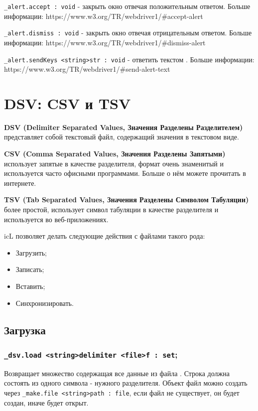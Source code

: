 \documentclass[a4paper, 14pt]{extarticle}
\newcommand{\ferror}[1]{{\fontsize{11pt}{12pt} \tt \colorbox{function}{\textcolor{white}{#1}}}}
\newenvironment{icItems}
	{ \begin{itemize} [noitemsep,nolistsep] }
	{ \end{itemize} }
\begin{document}
\lstinline|_alert.accept : void| - закрыть окно отвечая положительным ответом. Больше информации: https://www.w3.org/TR/webdriver1/\#accept-alert

\lstinline|_alert.dismiss : void| - закрыть окно отвечая отрицательным ответом. Больше информации: https://www.w3.org/TR/webdriver1/\#dismiss-alert

\lstinline|_alert.sendKeys <string>str : void| - ответить текстом . Больше информации: https://www.w3.org/TR/webdriver1/\#send-alert-text


\newpage
\section{DSV: CSV и TSV}

{\bf DSV (Delimiter Separated Values, Значения Разделены Разделителем)} представляет собой текстовый файл, содержащий значения в текстовом виде.

{\bf CSV (Comma Separated Values, Значения Разделены Запятыми)} использует запятые в качестве разделителя, формат очень знаменитый и используется часто офисными программами. Больше о нём можете прочитать в интернете.

{\bf TSV (Tab Separated Values, Значения Разделены Символом Табуляции)} более простой, использует символ табуляции в качестве разделителя и используется во веб-приложениях.

icL позволяет делать следующие действия с файлами такого рода:
\begin{icItems}
	\item Загрузить;
	\item Записать;
	\item Вставить;
	\item Синхронизировать.
\end{icItems}

\subsection{Загрузка}

\subsubsection{\lstinline|_dsv.load <string>delimiter <file>f : set|;}

Возвращает множество содержащая все данные из файла . Строка  должна состоять из одного символа - нужного разделителя. Объект файл можно создать через \lstinline|_make.file <string>path : file|, если файл не существует, он будет создан, иначе будет открыт.
\end{document}

